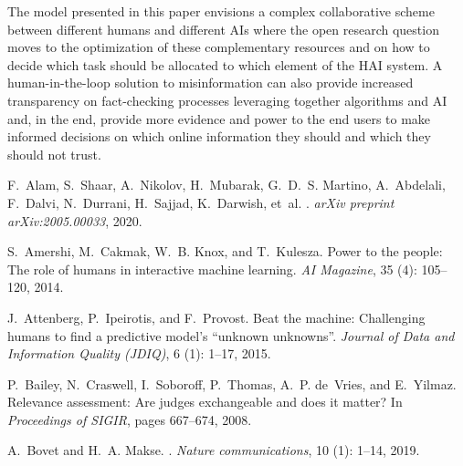 \documentclass[11pt]{article}
\begin{document}
The  model presented in this paper envisions a complex collaborative scheme between different humans and different AIs where the open research question moves to the optimization of these complementary resources and on how to decide which task should be allocated to which element of the HAI system.
A human-in-the-loop solution to misinformation can also provide increased transparency on  fact-checking processes leveraging together algorithms and AI and, in the end, provide more evidence and power to the end users to make informed decisions on which online information they should and which they should  not  trust.


%
%
\begin{thebibliography}{10}
	\itemsep=1pt
	\begin{small}
F.~Alam, S.~Shaar, A.~Nikolov, H.~Mubarak, G.~D.~S. Martino, A.~Abdelali,
F.~Dalvi, N.~Durrani, H.~Sajjad, K.~Darwish, et~al.
.
\newblock \emph{arXiv preprint arXiv:2005.00033}, 2020.

S.~Amershi, M.~Cakmak, W.~B. Knox, and T.~Kulesza.
\newblock Power to the people: The role of humans in interactive machine
learning.
\newblock \emph{AI Magazine}, 35 (4): 105--120, 2014.

J.~Attenberg, P.~Ipeirotis, and F.~Provost.
\newblock Beat the machine: Challenging humans to find a predictive model's
“unknown unknowns”.
\newblock \emph{Journal of Data and Information Quality (JDIQ)}, 6
(1): 1--17, 2015.

P.~Bailey, N.~Craswell, I.~Soboroff, P.~Thomas, A.~P. de~Vries, and E.~Yilmaz.
\newblock Relevance assessment: Are judges exchangeable and does it matter?
\newblock In \emph{Proceedings of SIGIR}, pages 667--674, 2008.

A.~Bovet and H.~A. Makse.
.
\newblock \emph{Nature communications}, 10 (1): 1--14, 2019.


\end{small}
\end{thebibliography}
\end{document}

